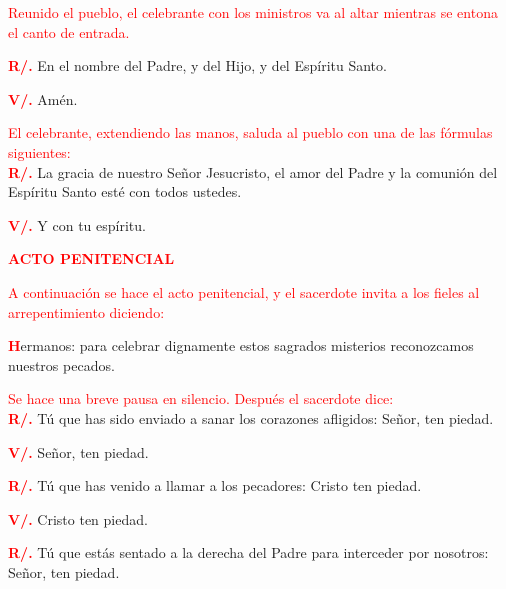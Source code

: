 \documentclass[12pt, letterpaper, spanish]{article}
\begin{document}
  \large {\textcolor{red}{Reunido el pueblo, el celebrante con los ministros va al altar mientras se entona el canto de entrada.}}

  \noindent
  \Large {\bfseries \textcolor{red}{R/.}} \hspace{1cm} {En el nombre del Padre, y del Hijo, y del Esp\'iritu Santo.}

  \noindent
  \Large{{\bfseries \textcolor{red}{V/.}} \hspace{1cm} Am\'en.}

  \large {\textcolor{red}{El celebrante, extendiendo las manos, saluda al pueblo con una de las f\'ormulas siguientes:}}\\
  \Large {\bfseries \textcolor{red}{R/.}} \hspace{1cm} La gracia de nuestro Se\~nor Jesucristo, el amor del Padre y la comuni\'on del Esp\'iritu Santo est\'e con todos ustedes.

  \noindent
  {\bfseries \textcolor{red}{V/.}} \hspace{1cm} \Large Y con tu esp\'iritu.

  \large {\bfseries \textcolor{red}{ACTO PENITENCIAL}}

  \large {\textcolor{red}{A continuaci\'on se hace el acto penitencial, y el sacerdote invita a los fieles al arrepentimiento
  diciendo:}}
  
  \lettrine[lines=2]{\bfseries \textcolor{red}{H}}{}\Large {ermanos: para celebrar dignamente estos sagrados misterios reconozcamos nuestros pecados.}

  \large {\textcolor{red}{Se hace una breve pausa en silencio. Despu\'es el sacerdote dice:}}\\
  \Large {\bfseries \textcolor{red}{R/.}} \hspace{1cm} T\'u que has sido enviado a sanar los corazones afligidos: Se\~nor, ten piedad.

  \noindent
  \Large {\bfseries \textcolor{red}{V/.}} \hspace{1cm} Se\~nor, ten piedad. 

  \noindent
  \Large {\bfseries \textcolor{red}{R/.}} \hspace{1cm} T\'u que has venido a llamar a los pecadores: Cristo ten piedad.

  \noindent
  \Large {\bfseries \textcolor{red}{V/.}} \hspace{1cm} Cristo ten piedad.

  \noindent
  \Large {\bfseries \textcolor{red}{R/.}} \hspace{1cm} T\'u que est\'as sentado a la derecha del Padre para interceder por nosotros: Se\~nor, ten piedad.
\end{document}

